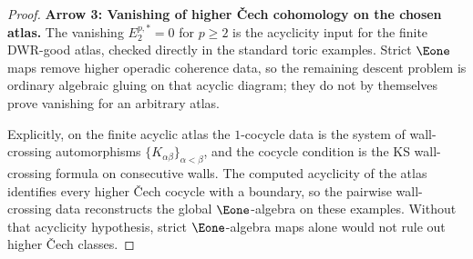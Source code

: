 \begin{proof}
\medskip
\noindent\textbf{Arrow 3: Vanishing of higher \v{C}ech cohomology on the chosen atlas.} The vanishing $E_2^{p,*} = 0$ for $p \geq 2$ is the acyclicity input for the finite DWR-good atlas, checked directly in the standard toric examples. Strict $\Eone$ maps remove higher operadic coherence data, so the remaining descent problem is ordinary algebraic gluing on that acyclic diagram; they do not by themselves prove vanishing for an arbitrary atlas.

Explicitly, on the finite acyclic atlas the $1$-cocycle data is the
system of wall-crossing automorphisms
$\{K_{\alpha\beta}\}_{\alpha<\beta}$, and the cocycle condition is the KS
wall-crossing formula on consecutive walls. The computed acyclicity of
the atlas identifies every higher \v{C}ech cocycle with a boundary, so
the pairwise wall-crossing data reconstructs the global $\Eone$-algebra
on these examples. Without that acyclicity hypothesis, strict
$\Eone$-algebra maps alone would not rule out higher \v{C}ech classes.
\end{proof}

